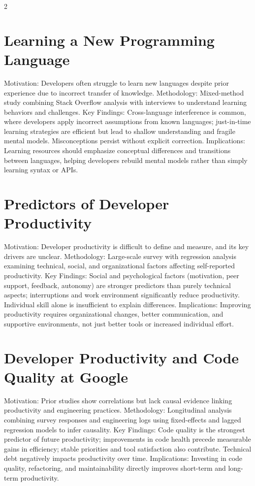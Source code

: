 \documentclass[8pt,a4paper]{extarticle}
\begin{document}
\begin{multicols*}{2}
    \section{Learning a New Programming Language}
    Motivation: Developers often struggle to learn new languages despite prior experience due to incorrect transfer of knowledge. Methodology: Mixed-method study combining Stack Overflow analysis with interviews to understand learning behaviors and challenges. Key Findings: Cross-language interference is common, where developers apply incorrect assumptions from known languages; just-in-time learning strategies are efficient but lead to shallow understanding and fragile mental models. Misconceptions persist without explicit correction. Implications: Learning resources should emphasize conceptual differences and transitions between languages, helping developers rebuild mental models rather than simply learning syntax or APIs.

    \section{Predictors of Developer Productivity}
    Motivation: Developer productivity is difficult to define and measure, and its key drivers are unclear. Methodology: Large-scale survey with regression analysis examining technical, social, and organizational factors affecting self-reported productivity. Key Findings: Social and psychological factors (motivation, peer support, feedback, autonomy) are stronger predictors than purely technical aspects; interruptions and work environment significantly reduce productivity. Individual skill alone is insufficient to explain differences. Implications: Improving productivity requires organizational changes, better communication, and supportive environments, not just better tools or increased individual effort.

    \section{Developer Productivity and Code Quality at Google}
    Motivation: Prior studies show correlations but lack causal evidence linking productivity and engineering practices. Methodology: Longitudinal analysis combining survey responses and engineering logs using fixed-effects and lagged regression models to infer causality. Key Findings: Code quality is the strongest predictor of future productivity; improvements in code health precede measurable gains in efficiency; stable priorities and tool satisfaction also contribute. Technical debt negatively impacts productivity over time. Implications: Investing in code quality, refactoring, and maintainability directly improves short-term and long-term productivity.


\end{multicols*}
\end{document}
